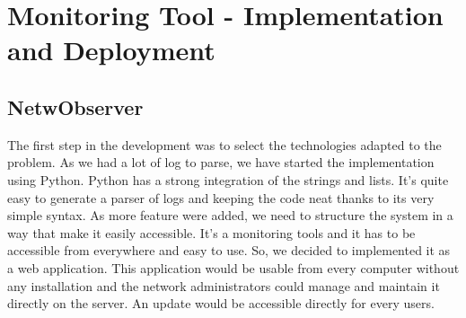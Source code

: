 \chapter{Monitoring Tool - Implementation and Deployment} %

\label{Chapter5} %


\section{NetwObserver}
The first step in the development was to select the technologies adapted to the problem. As we had a lot of log to parse, we have started the implementation using Python. Python has a strong integration of the strings and lists. It's quite easy to generate a parser of logs and keeping the code neat thanks to its very simple syntax.
As more feature were added, we need to structure the system in a way that make it easily accessible. It's a monitoring tools and it has to be accessible from everywhere and easy to use. So, we decided to implemented it as a web application. This application would be usable from every computer without any installation and the network administrators could manage and maintain it directly on the server. An update would be accessible directly for every users.

